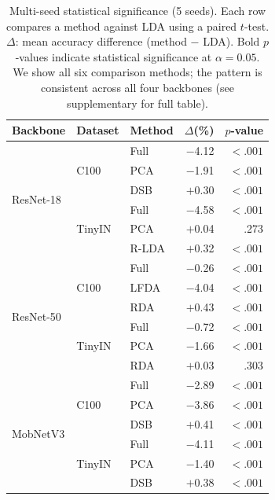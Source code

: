 \begin{table}[t]
\centering
\caption{Multi-seed statistical significance (5 seeds). Each row compares a method against LDA using a paired $t$-test. $\Delta$: mean accuracy difference (method $-$ LDA). Bold $p$-values indicate statistical significance at $\alpha = 0.05$. We show all six comparison methods; the pattern is consistent across all four backbones (see supplementary for full table).}
\label{tab:significance}
\small
\setlength{\tabcolsep}{3pt}
\begin{tabular}{@{}l l l r r@{}}
\toprule
Backbone & Dataset & Method & $\Delta$(\%) & $p$-value \\
\midrule
\multirow{6}{*}{ResNet-18}
& \multirow{3}{*}{C100}  & Full  & $-$4.12 & $\mathbf{<.001}$ \\
&                         & PCA   & $-$1.91 & $\mathbf{<.001}$ \\
&                         & DSB   & $+$0.30 & $\mathbf{<.001}$ \\
& \multirow{3}{*}{TinyIN} & Full  & $-$4.58 & $\mathbf{<.001}$ \\
&                         & PCA   & $+$0.04 & .273           \\
&                         & R-LDA & $+$0.32 & $\mathbf{<.001}$ \\
\midrule
\multirow{6}{*}{ResNet-50}
& \multirow{3}{*}{C100}  & Full  & $-$0.26 & $\mathbf{<.001}$ \\
&                         & LFDA  & $-$4.04 & $\mathbf{<.001}$ \\
&                         & RDA   & $+$0.43 & $\mathbf{<.001}$ \\
& \multirow{3}{*}{TinyIN} & Full  & $-$0.72 & $\mathbf{<.001}$ \\
&                         & PCA   & $-$1.66 & $\mathbf{<.001}$ \\
&                         & RDA   & $+$0.03 & .303           \\
\midrule
\multirow{6}{*}{MobNetV3}
& \multirow{3}{*}{C100}  & Full  & $-$2.89 & $\mathbf{<.001}$ \\
&                         & PCA   & $-$3.86 & $\mathbf{<.001}$ \\
&                         & DSB   & $+$0.41 & $\mathbf{<.001}$ \\
& \multirow{3}{*}{TinyIN} & Full  & $-$4.11 & $\mathbf{<.001}$ \\
&                         & PCA   & $-$1.40 & $\mathbf{<.001}$ \\
&                         & DSB   & $+$0.38 & $\mathbf{<.001}$ \\

\end{tabular}
\end{table}
